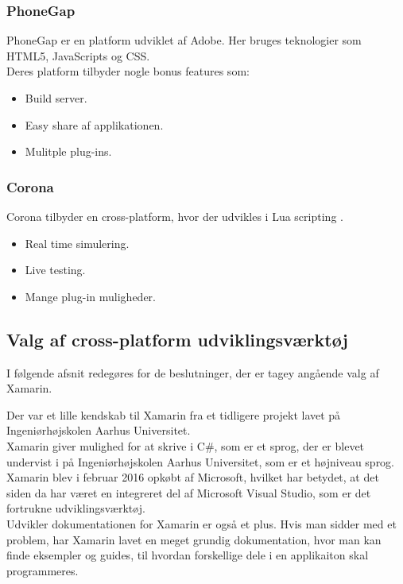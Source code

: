 \subsubsection{PhoneGap}
PhoneGap\cite{PhoneGap} er en platform udviklet af Adobe\cite{Adobe}. Her bruges teknologier som HTML5\cite{HTML5}, JavaScripts\cite{JavaScript} og CSS\cite{CSS}. \\
Deres platform tilbyder nogle bonus features som:
\begin{itemize}[-]
	\item Build server.
	\item Easy share af applikationen.
	\item Mulitple plug-ins.
\end{itemize}

\clearpage

\subsubsection{Corona}
Corona\cite{Corona} tilbyder en cross-platform, hvor der udvikles i Lua scripting \cite{Lua}.
\begin{itemize}[-]
	\item Real time simulering.
	\item Live testing.
	\item Mange plug-in muligheder.
\end{itemize}

\subsection{Valg af cross-platform udviklingsværktøj}
I følgende afsnit redegøres for de beslutninger, der er tagey angående valg af Xamarin.

Der var et lille kendskab til Xamarin fra et tidligere projekt lavet på Ingeniørhøjskolen Aarhus Universitet. \\
Xamarin giver mulighed for at skrive i C\#, som er et sprog, der er blevet undervist i på Ingeniørhøjskolen Aarhus Universitet, som er et højniveau sprog. \\
Xamarin blev i februar 2016 opkøbt af Microsoft, hvilket har betydet, at det siden da har været en integreret del af Microsoft Visual Studio, som er det fortrukne udviklingsværktøj.\\
Udvikler dokumentationen for Xamarin er også et plus. Hvis man sidder med et problem, har Xamarin lavet en meget grundig dokumentation, hvor man kan finde eksempler og guides, til hvordan forskellige dele i en applikaiton skal programmeres.

